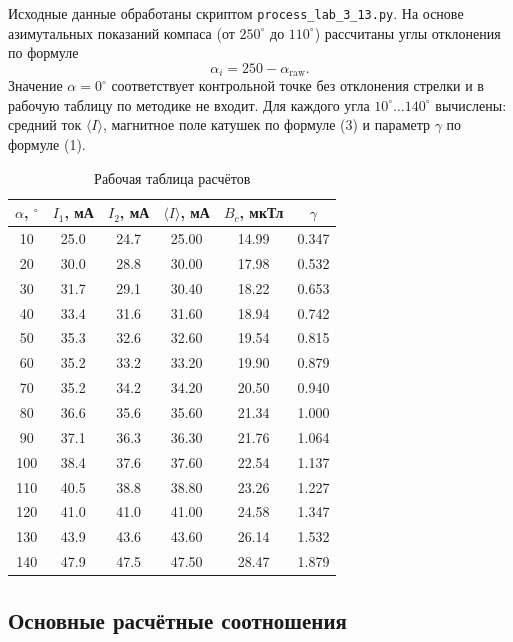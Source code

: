 \documentclass[a4paper,14pt]{extarticle}
\begin{document}
Исходные данные обработаны скриптом \texttt{process\_lab\_3\_13.py}. На основе азимутальных показаний компаса (от $250^\circ$ до $110^\circ$) рассчитаны углы отклонения по формуле
\[
\alpha_i = 250 - \alpha_{\text{raw}}.
\]
Значение $\alpha=0^\circ$ соответствует контрольной точке без отклонения стрелки и в рабочую таблицу по методике не входит. Для каждого угла $10^\circ\dots140^\circ$ вычислены: средний ток $\langle I\rangle$, магнитное поле катушек по формуле (3) и параметр $\gamma$ по формуле (1).

\begin{table}[H]
\centering
\caption{Рабочая таблица расчётов}
\small
\begin{tabular}{|c|c|c|c|c|c|}
\hline
            $\alpha$, $^\circ$ & $I_1$, мА & $I_2$, мА & $\langle I\rangle$, мА & $B_c$, мкТл & $\gamma$ \\
            \hline
            10 & 25.0 & 24.7 & 25.00 & 14.99 & 0.347 \\
            20 & 30.0 & 28.8 & 30.00 & 17.98 & 0.532 \\
            30 & 31.7 & 29.1 & 30.40 & 18.22 & 0.653 \\
            40 & 33.4 & 31.6 & 31.60 & 18.94 & 0.742 \\
            50 & 35.3 & 32.6 & 32.60 & 19.54 & 0.815 \\
            60 & 35.2 & 33.2 & 33.20 & 19.90 & 0.879 \\
            70 & 35.2 & 34.2 & 34.20 & 20.50 & 0.940 \\
            80 & 36.6 & 35.6 & 35.60 & 21.34 & 1.000 \\
            90 & 37.1 & 36.3 & 36.30 & 21.76 & 1.064 \\
            100 & 38.4 & 37.6 & 37.60 & 22.54 & 1.137 \\
            110 & 40.5 & 38.8 & 38.80 & 23.26 & 1.227 \\
            120 & 41.0 & 41.0 & 41.00 & 24.58 & 1.347 \\
            130 & 43.9 & 43.6 & 43.60 & 26.14 & 1.532 \\
            140 & 47.9 & 47.5 & 47.50 & 28.47 & 1.879 \\
\hline
\end{tabular}
\end{table}

\subsection*{Основные расчётные соотношения}
\end{document}
